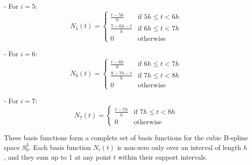 - For \(i = 5\):
  \[ N_{5}(t) = \begin{cases} 
  	\frac{t-5h}{h} & \text{if } 5h \leq t < 6h \\
  	\frac{7-6h-t}{h} & \text{if } 6h \leq t < 7h \\
  	0 & \text{otherwise}
  	\end{cases} \]

- For \(i = 6\):
  \[ N_{6}(t) = \begin{cases} 
  	\frac{t-6h}{h} & \text{if } 6h \leq t < 7h \\
  	\frac{8-7h-t}{h} & \text{if } 7h \leq t < 8h \\
  	0 & \text{otherwise}
  	\end{cases} \]

- For \(i = 7\):
  \[ N_{7}(t) = \begin{cases} 
  	\frac{t-7h}{h} & \text{if } 7h \leq t < 8h \\
  	0 & \text{otherwise}
  	\end{cases} \]

These basis functions form a complete set of basis functions for the cubic B-spline space \(S^3_0\). Each basis function \(N_i(t)\) is non-zero only over an interval of length \(h\), and they sum up to 1 at any point \(t\) within their support intervals.